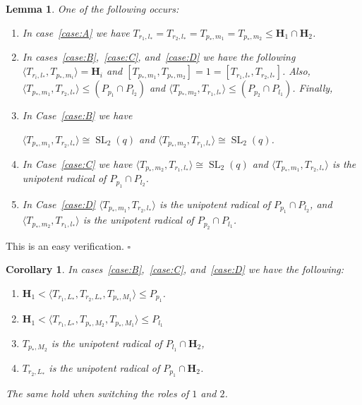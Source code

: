 \documentclass[12pt]{amsart}
\newtheorem{lemma}[theorem]{Lemma}
\newtheorem{corollary}[theorem]{Corollary}
\theoremstyle{definition}
\newcommand{\bpf}{\noindent{\bf Proof}\hspace{7pt}}
\newcommand{\epf}{\qed}
\newcommand{\ble}{\begin{lemma}}
\newcommand{\ele}{\end{lemma}}
\newcommand{\bco}{\begin{corollary}}
\newcommand{\eco}{\end{corollary}}
\DeclareMathOperator{\SL}{SL}
\renewcommand{\qed}{\hfill $\square$}
\newcommand{\amgrpH}{{\mathbf{H}}}
\begin{document}
\ble\label{lem:SLSLcommutingpairs}
One of the following occurs:
\begin{enumerate}
\item In case~\ref{case:A} we have $T_{r_1,l_*}=T_{r_2,l_*}=T_{p_*,m_1}=T_{p_*,m_2}\le \amgrpH_1\cap\amgrpH_2$. 
\item In cases~\ref{case:B},~\ref{case:C}, and~\ref{case:D} we have the following
$\langle T_{r_i,l_*},T_{p_*,m_i}\rangle=\amgrpH_i$ and 
 $[T_{p_*,m_1},T_{p_*,m_2}]=1=[T_{r_1,l_*},T_{r_2,l_*}]$.
Also, $\langle T_{p_*,m_1},T_{r_2,l_*}\rangle\le (P_{p_1}\cap P_{l_2})$ and 
$\langle T_{p_*,m_2},T_{r_1,l_*}\rangle\le (P_{p_2}\cap P_{l_1})$.
Finally, 

\item In Case~\ref{case:B} we have 

$\langle T_{p_*,m_1},T_{r_2,l_*}\rangle\cong\SL_2(q)$ and 
$\langle T_{p_*,m_2},T_{r_1,l_*}\rangle\cong\SL_2(q)$.
 
\item In Case~\ref{case:C} we have $\langle T_{p_*,m_2},T_{r_1,l_*}\rangle\cong\SL_2(q)$ and  
$\langle T_{p_*,m_1},T_{r_2,l_*}\rangle$ is the unipotent radical of $P_{p_1}\cap P_{l_2}$.
 
\item In Case~\ref{case:D} $\langle T_{p_*,m_1},T_{r_2,l_*}\rangle$ is the unipotent radical of $P_{p_1}\cap P_{l_2}$, and 
$\langle T_{p_*,m_2},T_{r_1,l_*}\rangle$ is the unipotent radical of $P_{p_2}\cap P_{l_1}$.
\end{enumerate}
\ele
\bpf
This is an easy verification.
\epf



\bco\label{cor:LLparabolics2}
In cases~\ref{case:B},~\ref{case:C}, and~\ref{case:D} we have the following:
\begin{enumerate}
\item $\amgrpH_1<\langle T_{r_1,L_*}, T_{r_2,L_*},T_{p_*,M_1}\rangle\le P_{p_1}$.
\item $\amgrpH_1<\langle T_{r_1,L_*}, T_{p_*,M_2},T_{p_*,M_1}\rangle\le P_{l_1}$
\item $T_{p_*,M_2}$ is the unipotent radical of $P_{l_1}\cap \amgrpH_2$,
\item $T_{r_2,L_*}$ is the unipotent radical of  $P_{p_1}\cap \amgrpH_2$.
%
\end{enumerate}
The same hold when switching the roles of $1$ and $2$.
\eco
\end{document}
